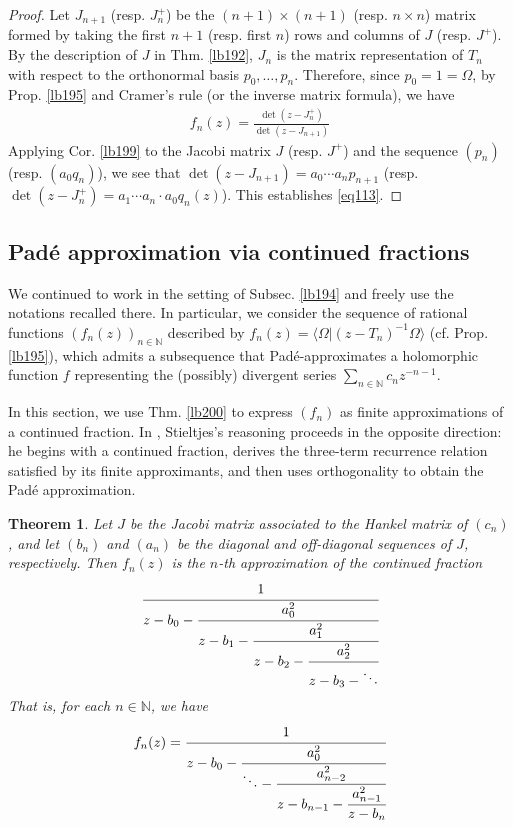 \documentclass[12pt,b5paper,notitlepage]{article}
\theoremstyle{definition}
\theoremstyle{plain}
\newtheorem{thm}[df]{Theorem}
\newcommand{\bk}[1]{\langle {#1}\rangle}
\newcommand{\Nbb}{\mathbb N}
\numberwithin{equation}{section}
\begin{document}
\begin{proof}
Let $J_{n+1}$ (resp. $J^+_n$) be the $(n+1)\times (n+1)$ (resp. $n\times n$)  matrix formed by taking the first $n+1$ (resp. first $n$) rows and columns of $J$ (resp. $J^+$). By the description of $J$ in Thm. \ref{lb192}, $J_n$ is the matrix representation of $T_n$ with respect to the orthonormal basis $p_0,\dots,p_n$. Therefore, since $p_0=1=\Omega$, by Prop. \ref{lb195} and Cramer's rule (or the inverse matrix formula), we have
\begin{align}
f_n(z)=\frac{\det(z-J^+_n)}{\det(z-J_{n+1})}
\end{align}
Applying Cor. \ref{lb199} to the Jacobi matrix $J$ (resp. $J^+$) and the sequence $(p_n)$ (resp. $(a_0q_n)$), we see that $\det(z-J_{n+1})=a_0\cdots a_np_{n+1}$ (resp. $\det(z-J^+_n)=a_1\cdots a_n\cdot a_0 q_n(z)$). This establishes \eqref{eq113}.
\end{proof}





\subsection{Pad\'e approximation via continued fractions}



We continued to work in the setting of Subsec. \ref{lb194} and freely use the notations recalled there. In particular, we consider the sequence of rational functions $(f_n(z))_{n\in\Nbb}$ described by $f_n(z)=\bk{\Omega|(z-T_n)^{-1}\Omega}$ (cf. Prop. \ref{lb195}), which admits a subsequence that Pad\'e-approximates a holomorphic function $f$ representing the (possibly) divergent series $\sum_{n\in\Nbb}c_nz^{-n-1}$. 

In this section, we use Thm. \ref{lb200} to express $(f_n)$ as finite approximations of a continued fraction. In \cite{Sti94}, Stieltjes's reasoning proceeds in the opposite direction: he begins with a continued fraction, derives the three-term recurrence relation satisfied by its finite approximants, and then uses orthogonality to obtain the Pad\'e approximation.

\begin{thm}
Let $J$ be the Jacobi matrix associated to the Hankel matrix of $(c_n)$, and let $(b_n)$ and $(a_n)$ be the diagonal and off-diagonal sequences of $J$, respectively. Then $f_n(z)$ is the $n$-th approximation of the continued fraction
\begin{align*}
\cfrac{1}{z-b_0-\cfrac{a_0^2}{z-b_1-\cfrac{a_1^2}{z-b_2-\cfrac{a_2^2}{z-b_3-\ddots}  } } }
\end{align*}
That is, for each $n\in\Nbb$, we have
\begin{align}\label{eq115}
f_n(z)=\cfrac{1}{z-b_0-\cfrac{a_0^2}{\ddots-\cfrac{a_{n-2}^2}{z-b_{n-1}-\cfrac{a_{n-1}^2}{z-b_n} } } }
\end{align}
\end{thm}
\end{document}
